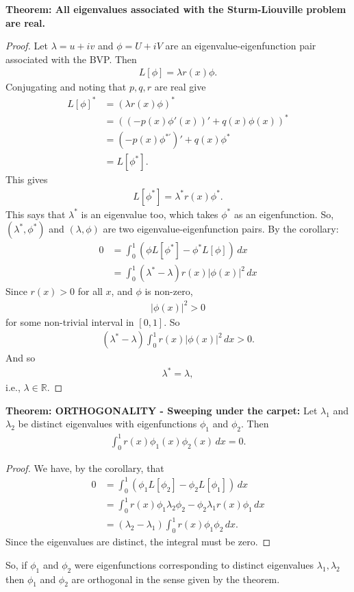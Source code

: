 \documentclass{article}
\theoremstyle{definition}
\begin{document}
	\textbf{Theorem: All eigenvalues associated with the Sturm-Liouville problem are real.}  
\begin{proof}
	Let $\lambda = u + iv$ and $\phi =U + iV$ are an eigenvalue-eigenfunction pair associated with the BVP. Then
	\begin{align*}
	L[\phi] = \lambda r(x)\phi.
	\end{align*}
	Conjugating and noting that $p,q,r$ are real give	
	\begin{align*}
	L[\phi]^* &= (\lambda r(x)\phi)^*\\
	&= ((-p(x)\phi'(x))' + q(x)\phi(x))^*\\
	&= (-p(x)\phi^{*'})' + q(x)\phi^*\\
	&= L[\phi^*].
	\end{align*}
	This gives
	\begin{align*}
	L[\phi^*] = \lambda^* r(x)\phi^*.
	\end{align*}
	This says that $\lambda^*$ is an eigenvalue too, which takes $\phi^*$ as an eigenfunction. So, $(\lambda^*,\phi^*)$ and $(\lambda,\phi)$ are two eigenvalue-eigenfunction pairs. By the corollary:
	\begin{align*}
	0 &= \int_{0}^1 (\phi L[\phi^*] - \phi^* L[\phi])\,dx\\
	&= \int^1_0 (\lambda^* -\lambda)r(x)\vert \phi(x)\vert^2\,dx
	\end{align*}
	Since $r(x) > 0$ for all $x$, and $\phi$ is non-zero, 
	\begin{align*}
	\vert \phi(x)\vert^2 > 0
	\end{align*}
	for some non-trivial interval in $[0,1]$. So
	\begin{align*}
	(\lambda^* -\lambda)\int^1_0 r(x)\vert \phi(x)\vert^2\,dx > 0.
	\end{align*}
	And so 
	\begin{align*}
	\lambda^* = \lambda,
	\end{align*}
	i.e., $\lambda \in \mathbb{R}$.
\end{proof}



	\textbf{Theorem: ORTHOGONALITY - Sweeping under the carpet:} Let $\lambda_1$ and $\lambda_2$ be distinct eigenvalues with eigenfunctions $\phi_1$ and $\phi_2$. Then 
	\begin{align*}
	\int^1_0 r(x)\phi_1(x)\phi_2(x)\,dx = 0.
	\end{align*} 
	\begin{proof}
		We have, by the corollary, that
		\begin{align*}
		0 &= \int^1_0 (\phi_1L[\phi_2] - \phi_2L[\phi_1])\,dx\\
		&= \int_{0}^1 r(x)\phi_1\lambda_2\phi_2 - \phi_2\lambda_1r(x)\phi_1\,dx\\
		&= (\lambda_2 - \lambda_1)\int^1_0 r(x)\phi_1\phi_2\,dx.
		\end{align*}
		Since the eigenvalues are distinct, the integral must be zero.
	\end{proof}
So, if $\phi_1$ and $\phi_2$ were eigenfunctions corresponding to distinct eigenvalues $\lambda_1, \lambda_2$ then $\phi_1$ and $\phi_2$ are orthogonal in the sense given by the theorem. \\
\end{document}

